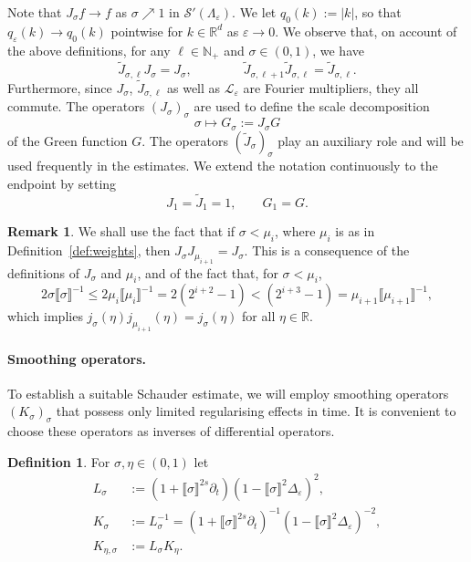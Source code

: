 \documentclass{article}
\numberwithin{equation}{section}
\newcommand{\assign}{:=}
\theoremstyle{plain}
\theoremstyle{definition}
\newtheorem{definition}[theorem]{Definition}
\newtheorem{remark}[theorem]{Remark}
\begin{document}
Note that $J_{\sigma}  f \rightarrow f$ as $\sigma \nearrow 1$ in
$\mathcal{S}' (\Lambda_{\varepsilon})$. We let $q_0 (k) \assign | k |$, so
that $q_{\varepsilon} (k) \rightarrow q_0 (k)$ pointwise for $k \in
\mathbb{R}^d$ as $\varepsilon \rightarrow 0$. We observe that, on account of
the above definitions, for any $\ell \in \mathbb{N}_+$ and $\sigma \in (0, 1)$,
we have
\begin{equation}
  \tilde{J}_{\sigma, \ell} J_{\sigma} = J_{\sigma}, \qquad \qquad
  \tilde{J}_{\sigma, \ell + 1} \tilde{J}_{\sigma, \ell} = \tilde{J}_{\sigma,
  \ell} . \label{eq:cutoff-symbol-properties}
\end{equation}
Furthermore, since $J_{\sigma}$, $\tilde{J}_{\sigma, \ell}$ as well as
$\mathcal{L}_{\varepsilon}$ are Fourier multipliers, they all commute. The
operators $(J_{\sigma} )_{\sigma}$ are used to define the scale decomposition
\[ \sigma \mapsto G_{\sigma} \assign J_{\sigma}  G \]
of the Green function $G$. The operators $(\tilde{J}_{\sigma} )_{\sigma}$ play
an auxiliary role and will be used frequently in the estimates. We extend the notation continuously to the endpoint by setting
\[
J_1=\tilde J_1=1,
\qquad
G_1=G.
\]

\begin{remark}
  \label{rmk:js}We shall use the fact that if $\sigma < \mu_i$, where $\mu_i$
  is as in Definition~\ref{def:weights}, then $J_{\sigma} J_{\mu_{i + 1}} =
  J_{\sigma}$. This is a consequence of the definitions of $J_{\sigma}$ and
  $\mu_i$, and of the fact that, for $\sigma < \mu_i$,
  \[ 2 \sigma \llbracket \sigma \rrbracket^{- 1} \leqslant 2 \mu_i 
     \llbracket \mu_i \rrbracket^{- 1} = 2 (2^{i + 2} - 1) < (2^{i + 3} - 1) =
     \mu_{i + 1}  \llbracket \mu_{i + 1} \rrbracket^{- 1}, \]
  which implies $j_{\sigma} (\eta) j_{\mu_{i + 1}} (\eta) = j_{\sigma} (\eta)$
  for all $\eta \in \mathbb{R}$.
\end{remark}

\paragraph*{Smoothing operators.} To establish a suitable Schauder estimate, we
will employ smoothing operators $(K_{\sigma})_{\sigma}$ that possess only
limited regularising effects in time. It is convenient to choose these
operators as inverses of differential operators.

\begin{definition}
  \label{def:regularizing-kernels}For $\sigma, \eta \in (0, 1)$ let
  \begin{align*}
    L_{\sigma} &\assign (1 + \llbracket \sigma \rrbracket^{2 s}
    \partial_t) (1 - \llbracket \sigma \rrbracket^2 \Delta_\varepsilon)^2,\\
    K_{\sigma} &\assign L_{\sigma}^{- 1}
    = {(1 + \llbracket \sigma \rrbracket^{2 s} \partial_t)^{- 1}}
    (1 - \llbracket \sigma \rrbracket^2 \Delta_\varepsilon)^{- 2},\\
    K_{\eta, \sigma} &\assign L_{\sigma} K_{\eta} .
  \end{align*}
\end{definition}
\end{document}
